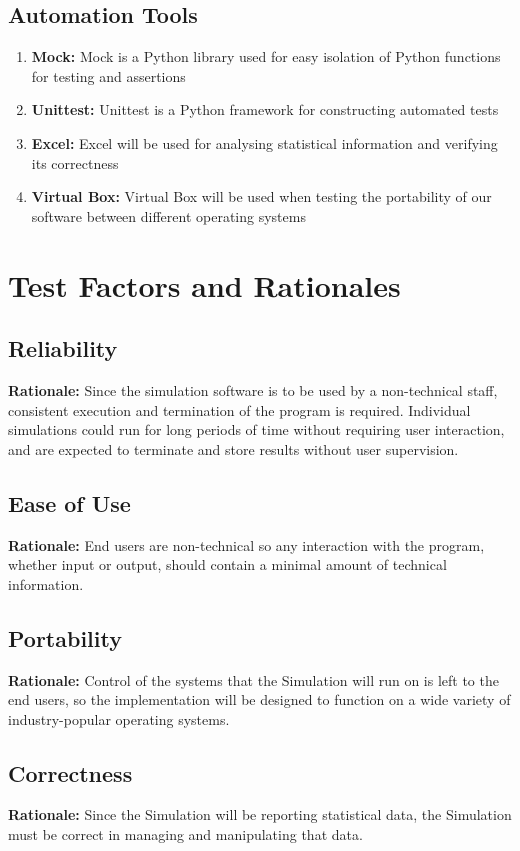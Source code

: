 \documentclass[paper=letter, fontsize=10pt]{scrartcl}
\numberwithin{equation}{section}		%
\numberwithin{figure}{section}			%
\numberwithin{table}{section}				%
\begin{document}
\subsection{Automation Tools}
\begin{enumerate}
	\item \textbf{Mock:} Mock is a Python library used for easy isolation of Python functions for testing and assertions
	\item \textbf{Unittest:} Unittest is a Python framework for constructing automated tests
	\item \textbf{Excel:} Excel will be used for analysing statistical information and verifying its correctness
	\item \textbf{Virtual Box:} Virtual Box will be used when testing the portability of our software between different operating systems
\end{enumerate}


\section{Test Factors and Rationales}
\subsection{Reliability}
\textbf{Rationale:} Since the simulation software is to be used by a non-technical staff, consistent execution and termination of the program is required. Individual simulations could run for long periods of time without requiring user interaction, and are expected to terminate and store results without user supervision.
\subsection{Ease of Use}
\textbf{Rationale:} End users are non-technical so any interaction with the program, whether input or output, should contain a minimal amount of technical information.  
\subsection{Portability} 
\textbf{Rationale:} Control of the systems that the Simulation will run on is left to the end users, so the implementation will be designed to function on a wide variety of industry-popular operating systems.
\subsection{Correctness}
\textbf{Rationale:} Since the Simulation will be reporting statistical data, the Simulation must be correct in managing and manipulating that data.  
\end{document}
